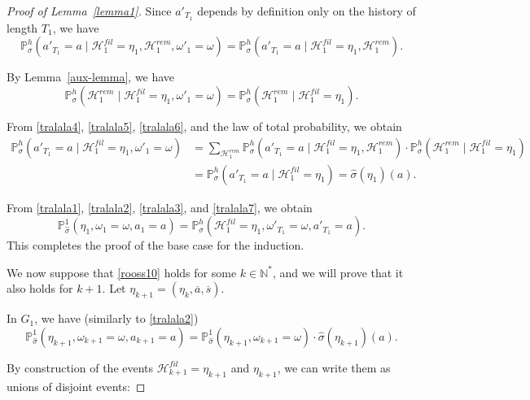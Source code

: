 \documentclass[10pt,a4paper]{amsart}
\newcommand{\N}{\mathbb{N}}
\renewcommand{\P}{\mathbb{P}}
\begin{document}
\begin{proof}[Proof of Lemma~\ref{lemma1}]
Since $a'_{T_{1}}$ depends by definition only on the history of length $T_{1}$, we have
\begin{equation}
\P_{\sigma}^h (a'_{T_1} = a \mid \mathcal H^{fil}_1 = \eta_1, \mathcal H^{rem}_1, \omega'_{1} = \omega) = \P_{\sigma}^h (a'_{T_1} = a \mid \mathcal H^{fil}_1 = \eta_1, \mathcal H^{rem}_1).
\label{tralala5}
\end{equation}


By Lemma~\ref{aux-lemma}, we have
\begin{equation}
\P_{\sigma}^h (\mathcal H^{rem}_1 \mid \mathcal H^{fil}_1 = \eta_1, \omega'_{1} = \omega) = \P_{\sigma}^h (\mathcal H^{rem}_1 \mid \mathcal H^{fil}_1 = \eta_1).
\label{tralala6}
\end{equation}

From \eqref{tralala4}, \eqref{tralala5}, \eqref{tralala6}, and the law of total probability, we obtain
\begin{equation}
\begin{aligned}
\P_{\sigma}^h (a'_{T_1} = a \mid \mathcal H^{fil}_1 = \eta_1, \omega'_{1} = \omega) 
&=
\sum_{\mathcal H^{rem}_1}
\P_{\sigma}^h (a'_{T_1} = a \mid \mathcal H^{fil}_1 = \eta_1, \mathcal H^{rem}_1) \cdot 
\P_{\sigma}^h (\mathcal H^{rem}_1 \mid \mathcal H^{fil}_1 = \eta_1) \\
&=
\P_{\sigma}^h (a'_{T_1} = a \mid \mathcal H^{fil}_1 = \eta_1)
=
\widehat \sigma(\eta_1)(a).
\end{aligned}
\label{tralala7}
\end{equation}

From \eqref{tralala1}, \eqref{tralala2}, \eqref{tralala3}, and \eqref{tralala7}, we obtain
$$\P_{\widehat \sigma}^1(\eta_1, \omega_1 = \omega, a_1 = a) = \P_{\sigma}^h(\mathcal H^{fil}_1 = \eta_1, \omega'_{T_1} = \omega, a'_{T_1} = a). $$
This completes the proof of the base case for the induction.

We now suppose that \eqref{rooss10} holds for some $k \in \N^*$, and we will prove that it also holds for $k+1$. Let $\eta_{k+1} = (\eta_k, \overline a, \overline s).$

In $G_1$, we have (similarly to \eqref{tralala2})
\begin{equation} 
\P_{\widehat \sigma}^1(\eta_{k+1}, \omega_{k+1} = \omega, a_{k+1} = a) = \P_{\widehat \sigma}^1(\eta_{k+1}, \omega_{k+1} = \omega) \cdot \widehat \sigma(\eta_{k+1})(a).
\label{roo10}
\end{equation}

By construction of the events $\mathcal H^{fil}_{k+1} = \eta_{k+1}$ and $\eta_{k+1}$, we can write them as unions of disjoint events:


\end{proof}
\end{document}

